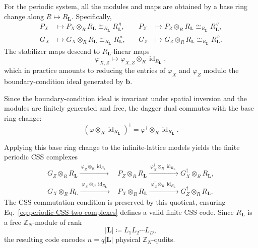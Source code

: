 \documentclass[aps,prx,english,superscriptaddress,twocolumn,tightenlines,showpacs,longbibliography,floatfix,amsfonts]{revtex4-2}
\theoremstyle{remark}
\theoremstyle{definition}
\begin{document}
For the periodic system, all the modules and maps are obtained by a base ring change along $R \mapsto R_{\mathbf L}$. Specifically,
\begin{equation}
	\begin{aligned}
		P_X &\mapsto P_X\otimes_R R_{\mathbf L} \cong_{R_{\mathbf L}} R_{\mathbf L}^{\,q}, &\quad P_Z &\mapsto P_Z\otimes_R R_{\mathbf L} \cong_{R_{\mathbf L}} R_{\mathbf L}^{\,q}, \\
		G_X &\mapsto G_X\otimes_R R_{\mathbf L} \cong_{R_{\mathbf L}} R_{\mathbf L}^{\,a}, &\quad G_Z &\mapsto G_Z\otimes_R R_{\mathbf L} \cong_{R_{\mathbf L}} R_{\mathbf L}^{\,b}.
	\end{aligned}
	\label{eq:periodic-modules}
\end{equation}
The stabilizer maps descend to $R_{\mathbf L}$-linear maps
\begin{equation}
	\varphi_{X,Z} \mapsto \varphi_{X,Z} \otimes_R \operatorname{id}_{R_{\mathbf L}},
	\label{eq:periodic-stabilizer-maps-general}
\end{equation}
which in practice amounts to reducing the entries of $\varphi_X$ and $\varphi_Z$ modulo the boundary-condition ideal generated by $\mathbf{b}$.

Since the boundary-condition ideal is invariant under spatial inversion and the modules are finitely generated and free, the dagger dual commutes with the base ring change:
\begin{equation}
	\left(\varphi\otimes_R \operatorname{id}_{R_{\mathbf L}}\right)^\dagger = \varphi^\dagger\otimes_R \operatorname{id}_{R_{\mathbf L}}.
	\label{eq:periodic-dagger-compatibility}
\end{equation}

Applying this base ring change to the infinite-lattice models yields the finite periodic CSS complexes
\begin{equation}
	\begin{split}
		G_Z \otimes_R R_{\mathbf{L}} \xrightarrow{\;\varphi_Z \otimes_R \operatorname{id}_{R_{\mathbf{L}}}\;} &P_Z \otimes_R R_{\mathbf{L}} \xrightarrow{\;\varphi_X^\dagger \otimes_R \operatorname{id}_{R_{\mathbf{L}}}\;} G_X^\dagger \otimes_R R_{\mathbf{L}}, \\
		G_X \otimes_R R_{\mathbf{L}} \xrightarrow{\;\varphi_X \otimes_R \operatorname{id}_{R_{\mathbf{L}}}\;} &P_X \otimes_R R_{\mathbf{L}} \xrightarrow{\;\varphi_Z^\dagger \otimes_R \operatorname{id}_{R_{\mathbf{L}}}\;} G_Z^\dagger \otimes_R R_{\mathbf{L}}.
	\end{split}
	\label{eq:periodic-CSS-two-complexes}
\end{equation}
The CSS commutation condition is preserved by this quotient, ensuring Eq.~\eqref{eq:periodic-CSS-two-complexes} defines a valid finite CSS code. Since $R_{\mathbf L}$ is a free $\mathbb Z_N$-module of rank
\begin{equation}
	|\mathbf L| \coloneqq L_1L_2\cdots L_D,
\end{equation}
the resulting code encodes $n = q|\mathbf L|$ physical $\mathbb Z_N$-qudits.
\end{document}
